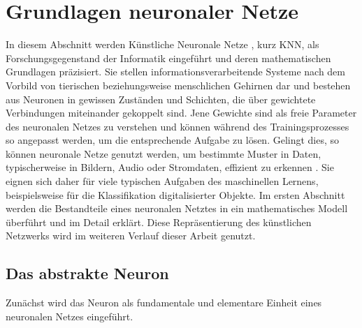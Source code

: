\chapter{Grundlagen neuronaler Netze}
\label{kapitel_neuralnetworks}

In diesem Abschnitt werden Künstliche Neuronale Netze \cite{dayhoff1990neural}, kurz KNN, als Forschungsgegenstand der Informatik eingeführt und deren mathematischen Grundlagen präzisiert. 
Sie stellen informationsverarbeitende Systeme nach dem Vorbild von tierischen beziehungsweise menschlichen Gehirnen dar und bestehen aus Neuronen in gewissen Zuständen und Schichten, die über gewichtete Verbindungen miteinander gekoppelt sind. Jene Gewichte sind als freie Parameter des neuronalen Netzes zu verstehen und können während des Trainingsprozesses so angepasst werden, um die entsprechende Aufgabe zu lösen.  
Gelingt dies, so können neuronale Netze genutzt werden, um bestimmte Muster in Daten, typischerweise in Bildern, Audio oder Stromdaten, effizient zu erkennen \cite{pandya1995pattern, pao1989adaptive, urbaniak2021quality}.
Sie eignen sich daher für viele typischen Aufgaben des maschinellen Lernens, beispielsweise für die Klassifikation digitalisierter Objekte.
Im ersten Abschnitt werden die Bestandteile eines neuronalen Netztes in ein mathematisches Modell überführt und im Detail erklärt. Diese Repräsentierung des künstlichen Netzwerks wird im weiteren Verlauf dieser Arbeit genutzt. 

\section{Das abstrakte Neuron}
\label{neuronabs}
Zunächst wird das Neuron als fundamentale und elementare Einheit eines neuronalen Netzes eingeführt.